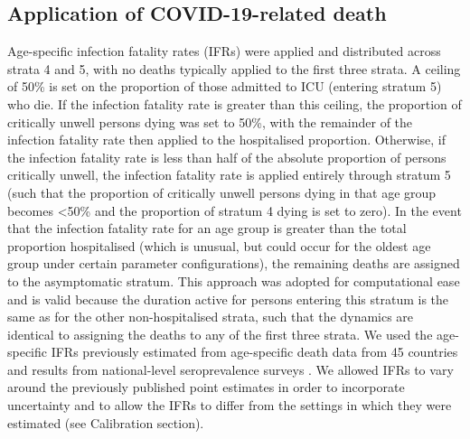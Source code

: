 \subsection{Application of COVID-19-related death}
Age-specific infection fatality rates (IFRs) were applied and distributed across strata 4 and 5, with no deaths typically applied to the first three strata. A ceiling of 50\% is set on the proportion of those admitted to ICU (entering stratum 5) who die. If the infection fatality rate is greater than this ceiling, the proportion of critically unwell persons dying was set to 50\%, with the remainder of the infection fatality rate then applied to the hospitalised proportion. Otherwise, if the infection fatality rate is less than half of the absolute proportion of persons critically unwell, the infection fatality rate is applied entirely through stratum 5 (such that the proportion of critically unwell persons dying in that age group becomes \textless 50\% and the proportion of stratum 4 dying is set to zero). In the event that the infection fatality rate for an age group is greater than the total proportion hospitalised (which is unusual, but could occur for the oldest age group under certain parameter configurations), the remaining deaths are assigned to the asymptomatic stratum. This approach was adopted for computational ease and is valid because the duration active for persons entering this stratum is the same as for the other non-hospitalised strata, such that the dynamics are identical to assigning the deaths to any of the first three strata. We used the age-specific IFRs previously estimated from age-specific death data from 45 countries and results from national-level seroprevalence surveys \cite{RN6}. We allowed IFRs to vary around the previously published point estimates in order to incorporate uncertainty and to allow the IFRs to differ from the settings in which they were estimated (see Calibration section).

